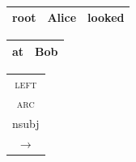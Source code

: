 \documentclass[t]{beamer}
\begin{document}
\begin{frame}
{\begin{varwidth}{2.2\linewidth}
{\begin{dependency}
	\end{dependency}
	\\
	\begin{tabular}{|l|l|l|}\hline
	\color{red} root & \color{red} Alice & \color{red} looked \\ \hline
	\end{tabular}
	\hfill
	\begin{tabular}{|l|l|}\hline
	\color{blue} at & \color{blue} Bob \\ \hline
	\end{tabular}
	}
	\begin{tabular}{c}\textsc{left}\\ \textsc{arc}\\{\footnotesize nsubj}\\$\rightarrow$\end{tabular}

    \vspace{5mm}
	

\end{varwidth}}
\end{frame}
\end{document}
